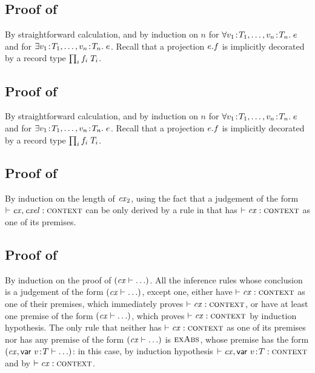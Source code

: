 \subsection*{Proof of }

By straightforward calculation, and by induction on $n$ for
$\forall v_1\!:\!T_1,\ldots,v_n\!:\!T_n.\;e$ and for
$\exists v_1\!:\!T_1,\ldots,v_n\!:\!T_n.\;e$. Recall that
a projection $e.f$ is implicitly decorated by a record type $\prod_{i}f_i\;T_i$.



\subsection*{Proof of }

By straightforward calculation, and by induction on $n$ for
$\forall v_1\!:\!T_1,\ldots,v_n\!:\!T_n.\;e$ and for
$\exists v_1\!:\!T_1,\ldots,v_n\!:\!T_n.\;e$. Recall that
a projection $e.f$ is implicitly decorated by a record type $\prod_{i}f_i\;T_i$.



\subsection*{Proof of }

By induction on the length of $\mathit{cx}_2$, using the fact that a judgement of the
form $\vdash\mathit{cx},\mathit{cxel}:\textsc{context}$ can be only derived by a rule in
 that has $\vdash\mathit{cx}:\textsc{context}$ as one of its premises.



\subsection*{Proof of }

By induction on the proof of $(\mathit{cx}\vdash\ldots)$. All the inference rules whose
conclusion is a judgement of the form $(\mathit{cx}\vdash\ldots)$, except one, either
have $\vdash\mathit{cx}:\textsc{context}$ as one of their premises, which immediately proves $\vdash\mathit{cx}:\textsc{context}$, or
have at least one premise of the form $(\mathit{cx}\vdash\ldots)$, which proves $\vdash\mathit{cx}:\textsc{context}$
by induction hypothesis. The only rule that neither has $\vdash\mathit{cx}:\textsc{context}$ as one of its
premises nor has any premise of the form $(\mathit{cx}\vdash\ldots)$ is $\textsc{exAbs}$, whose
premise has the form $(\mathit{cx},\mathsf{var}\ v\!:\!T\vdash\ldots)$: in this case, by
induction hypothesis $\vdash\mathit{cx},\mathsf{var}\ v\!:\!T:\textsc{context}$ and by 
$\vdash\mathit{cx}:\textsc{context}$.



